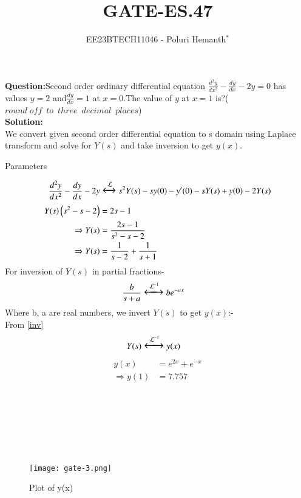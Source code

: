 \documentclass[journal,12pt,twocolumn]{IEEEtran}
\theoremstyle{remark}
\begin{document}

\vspace{3cm}

\title{GATE-ES.47}
\author{EE23BTECH11046 - Poluri Hemanth$^{*}$}
\maketitle
\textbf{Question:}Second order ordinary differential equation $\frac{d^2y}{dx^2}-\frac{dy}{dx}-2y=0$ has values 
$y=2$ and$\frac{dy}{dx}=1$ at $x=0$.The value of $y$ at $x=1$ is?($round\; off\;\: to\;\: three\;\: decimal\;\: places$)
\\
\textbf{Solution:}\\
We convert given second order differential equation to s domain using Laplace transform and solve for $Y(s)$ and take inversion to get $y(x)$.
\begin{table}[h!]
	
        \caption{Parameters}
        \label{tab:es.47}
\end{table}


\begin{align}
    \frac{d^2y}{dx^2}-\frac{dy}{dx}-2y&\Large\xleftrightarrow{\mathcal{L}}s^2Y(s)-sy(0)-y'(0)-sY(s)+y(0)-2Y(s)\\
	Y(s)\left(s^2-s-2\right)&=2s-1\\
    \Rightarrow Y(s)&=\frac{2s-1}{s^2-s-2}\\
    \Rightarrow Y(s)&=\frac{1}{s-2}+\frac{1}{s+1}
\end{align}
For inversion of $Y(s)$ in partial fractions-
\begin{align}
    &\frac{b}{s+a}\Large\xleftrightarrow{\mathcal{L}^{-1}}be^{-ax}\label{inv}
\end{align}
Where b, a are real numbers, we invert $Y(s)$ to get $y(x)$:-\\
From \eqref{inv}
\begin{align}
    &Y(s)\Large\xleftrightarrow{\mathcal{L}^{-1}} y(x)
\end{align}
\begin{align}
	y(x)&=e^{2x}+e^{-x}\\
   \Rightarrow y(1)&=7.757
\end{align}\\
\\
\\
\\
\\
\\
\begin{figure}
    \centering
    \texttt{[image: gate-3.png]}
	\caption{Plot of y(x)}
    \label{fig:enter-label}
\end{figure}
\end{document}
